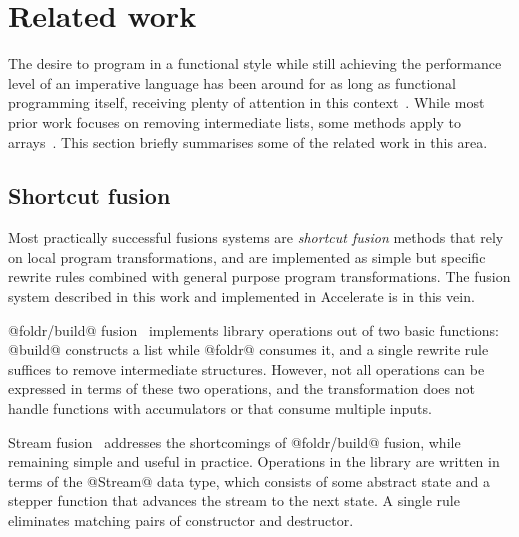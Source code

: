 \section{Related work}
\label{sec:fusion_related_work}

The desire to program in a functional style while still achieving the
performance level of an imperative language has been around for as long as
functional programming itself, receiving plenty of attention in this
context~\cite{Coutts:2007kp,Gill:1993de,Hu:1997tk,Meijer:1991,Rompf:2013er,Takano:1995,Wadler:1984ia,Waters:1991fp}.
While most prior work focuses on removing intermediate lists, some methods apply
to arrays~\cite{Chakravarty:2001dt,Claessen:2012hl,Grelck:2006ci,Keller:2010er}.
This section briefly summarises some of the related work in this area.


\subsection{Shortcut fusion}

\fusion[shortcut|(]{}

Most practically successful fusions systems are \emph{shortcut fusion} methods
that rely on local program transformations, and are implemented as simple but
specific rewrite rules combined with general purpose program transformations.
The fusion system described in this work and implemented in Accelerate is in
this vein.


@foldr/build@ fusion~\cite{Gill:1996tf,Gill:1993de}
implements library operations out of two basic functions: @build@
constructs a list while @foldr@ consumes it, and a single rewrite rule suffices
to remove intermediate structures. However, not all operations can be expressed
in terms of these two operations, and the transformation does not handle
functions with accumulators or that consume multiple inputs.

Stream fusion~\cite{Coutts:2007kp} addresses the shortcomings of @foldr/build@
fusion, while remaining simple and useful in practice. Operations in the library
are written in terms of the @Stream@ data type, which consists of some abstract
state and a stepper function that advances the stream to the next state. A
single rule eliminates matching pairs of constructor and destructor.

